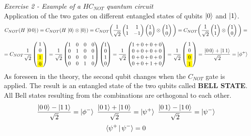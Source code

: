 \textit{Exercise 2 - Example of a $HC_{NOT}$ quantum circuit}\\\newline
Application of the two gates on different entangled states of qubits $\ket{0}$ and $\ket{1}$.
\[
C_{NOT}(H\,\ket{0\,0})=C_{NOT}(H\,\ket{0}\otimes\ket{0})=C_{NOT}\bigg(\frac{1}{\sqrt{2}}\begin{pmatrix}1&1\\1&-1\end{pmatrix}\begin{pmatrix}1\\0\end{pmatrix}\otimes\begin{pmatrix}1\\0\end{pmatrix}\bigg)=C_{NOT}\bigg(\frac{1}{\sqrt{2}}\begin{pmatrix}1\\1\end{pmatrix}\otimes\begin{pmatrix}1\\0\end{pmatrix}\bigg)=
\]
\[
=C_{NOT}\frac{1}{\sqrt{2}}\begin{pmatrix}1\\0\\\mathcolorbox{yellow}{1}\\\mathcolorbox{yellow}{0}\end{pmatrix}=\frac{1}{\sqrt{2}}\begin{pmatrix}1&0&0&0\\0&1&0&0\\0&0&0&1\\0&0&1&0\end{pmatrix}\begin{pmatrix}1\\0\\1\\0\end{pmatrix}=\frac{1}{\sqrt{2}}\begin{pmatrix}1+0+0+0\\0+0+0+0\\0+0+0+0\\0+0+1+0\end{pmatrix}=\frac{1}{\sqrt{2}}\begin{pmatrix}1\\0\\\mathcolorbox{yellow}{0}\\\mathcolorbox{yellow}{1}\end{pmatrix}=\frac{\ket{0\,0}+\ket{1\,1}}{\sqrt{2}}=\ket{\phi^+}
\]
As foreseen in the theory, the second qubit changes when the $C_{NOT}$ gate is applied. The result is an entangled state of the two qubits called \textbf{BELL STATE}. All Bell states resulting from the combinations are orthogonal to each other.
\[\frac{\ket{0\,0}-\ket{1\,1}}{\sqrt{2}}=\ket{\phi^-}\,\,\frac{\ket{0\,1}+\ket{1\,0}}{\sqrt{2}}=\ket{\psi^+}\,\,\frac{\ket{0\,1}-\ket{1\,0}}{\sqrt{2}}=\ket{\psi^-}\]
\[\braket{\psi^+\,|\,\psi^-}=0\]
